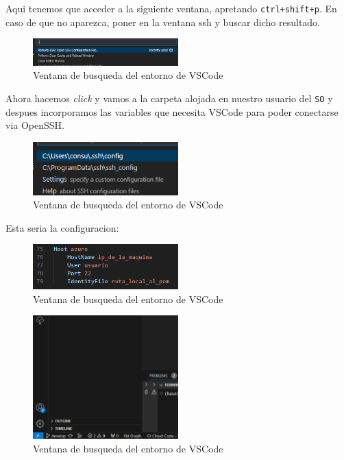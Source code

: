 Aqui tenemos que acceder a la siguiente ventana, apretando \texttt{ctrl+shift+p}. En caso de que no aparezca, poner en la ventana ssh y buscar dicho resultado.

\begin{figure}[h!]
    \centering
    \includegraphics[width=0.5\textwidth]{imagenes/ssh_vscode.png}
    \caption[Ventana de busqueda del entorno de VSCode]{Ventana de busqueda del entorno de VSCode}
\end{figure}

Ahora hacemos \textit{click} y vamos a la carpeta alojada en nuestro usuario del \texttt{SO} y despues incorporamos las variables
que necesita VSCode para poder conectarse via OpenSSH.

\begin{figure}[h!]
    \centering
    \includegraphics[width=0.5\textwidth]{imagenes/carpeta_local_ssh.png}
    \caption[Ventana de busqueda del entorno de VSCode]{Ventana de busqueda del entorno de VSCode}
\end{figure}

Esta seria la configuracion:

\begin{figure}[h!]
    \centering
    \includegraphics[width=0.5\textwidth]{imagenes/archivo_configuracion_ssh_vscode.png}
    \caption[Ventana de busqueda del entorno de VSCode]{Ventana de busqueda del entorno de VSCode}
\end{figure}

\begin{figure}[h!]
    \centering
    \includegraphics[width=0.5\textwidth]{imagenes/esquina_inferior_izquierda.png}
    \caption[Ventana de busqueda del entorno de VSCode]{Ventana de busqueda del entorno de VSCode}
\end{figure}

